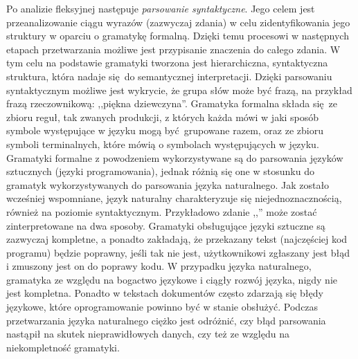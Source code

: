 \documentclass[a4paper, twoside, 12pt]{report}
\begin{document}
            Po analizie fleksyjnej następuje \emph{parsowanie syntaktyczne}. Jego celem jest przeanalizowanie ciągu wyrazów
            (zazwyczaj zdania) w celu zidentyfikowania jego struktury w oparciu o gramatykę formalną. Dzięki temu procesowi
            w następnych etapach przetwarzania możliwe jest przypisanie znaczenia do całego zdania. W tym celu na podstawie
            gramatyki tworzona jest hierarchiczna, syntaktyczna struktura, która nadaje się do semantycznej interpretacji.
            Dzięki parsowaniu syntaktycznym możliwe jest wykrycie, że grupa słów może być frazą, na przykład frazą
            rzeczownikową: ,,piękna dziewczyna''.
            Gramatyka formalna składa się ze zbioru reguł, tak zwanych produkcji, z których każda mówi w jaki sposób symbole występujące
            w języku mogą być grupowane razem, oraz ze zbioru symboli terminalnych, które mówią o symbolach występujących
            w języku.
            Gramatyki formalne z powodzeniem wykorzystywane są do parsowania języków sztucznych (języki programowania),
            jednak różnią się one w stosunku do gramatyk wykorzystywanych do parsowania języka naturalnego. Jak zostało
            wcześniej wspomniane, język naturalny charakteryzuje się niejednoznacznością, również na poziomie syntaktycznym.
            Przykładowo zdanie ,,'' może zostać zinterpretowane na dwa sposoby.
            Gramatyki obsługujące języki sztuczne są zazwyczaj kompletne, a ponadto zakładają, że przekazany tekst
            (najczęściej kod programu) będzie poprawny, jeśli tak nie jest, użytkownikowi zgłaszany jest błąd i zmuszony
            jest on do poprawy kodu. W przypadku języka naturalnego, gramatyka ze względu na bogactwo językowe i ciągły
            rozwój języka, nigdy nie jest kompletna. Ponadto w tekstach dokumentów często zdarzają się błędy językowe,
            które oprogramowanie powinno być w stanie obsłużyć. Podczas przetwarzania języka naturalnego ciężko jest odróżnić,
            czy błąd parsowania nastąpił na skutek nieprawidłowych danych, czy też ze względu na niekompletność gramatyki.
\end{document}
